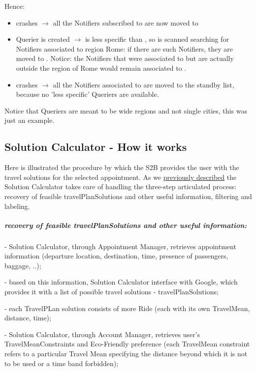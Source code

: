 	Hence:
	\begin{itemize}[label=--]
		\item {} crashes $\rightarrow$ all the Notifiers subscribed to  are now moved to 
		\item {} Querier is created $\rightarrow$  is less specific than , so  is scanned searching for Notifiers associated to region Rome: if there are such Notifiers, they are moved to . Notice: the Notifiers that were associated to  but are actually outside the region of Rome would remain associated to .
		\item {} crashes $\rightarrow$ all the Notifiers associated to  are moved to the standby list, because no 'less specific' Queriers are available.
	\end{itemize}
	\smallskip
	Notice that Queriers are meant to be wide regions and not single cities, this was just an example.

\subsection{Solution Calculator - How it works}
		Here is illustrated the procedure by which the S2B provides the user with the travel solutions for the selected appointment.
		As we \hyperref[sect:Select TravelPlan Solution]{previously described} the Solution Calculator takes care of handling the three-step  articulated process: recovery of feasible travelPlanSolutions and other useful information, filtering and labeling.
	\subparagraph{recovery of feasible travelPlanSolutions and other useful information:}
	
		- Solution Calculator, through Appointment Manager, retrieves appointment information (departure location, destination, time, presence of passengers, baggage, ..);\newline
		
		- based on this information, Solution Calculator interface with Google, which provides it with a list of possible travel solutions - travelPlanSolutions;\newline
		
		- each TravelPLan solution consists of more Ride (each with its own TravelMean, distance, time);\newline
		
		- Solution Calculator, through Account Manager, retrieves user's TravelMeanConstraints and Eco-Friendly preference (each TravelMean constraint refers to a particular Travel Mean specifying the distance beyond which it is not to be used or a time band forbidden);\newline
		
